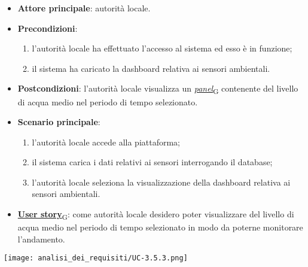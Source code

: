 \begin{itemize}
	\item \textbf{Attore principale}: autorità locale.
	\item \textbf{Precondizioni}:
	      \begin{enumerate}
		      \item l'autorità locale ha effettuato l'accesso al sistema ed esso è in funzione;
		      \item il sistema ha caricato la dashboard relativa ai sensori ambientali.
	      \end{enumerate}
	\item \textbf{Postcondizioni}: l'autorità locale visualizza un \href{https://7last.github.io/docs/pb/documentazione-interna/glossario\#panel}{\textit{panel}\textsubscript{G}} contenente del livello di acqua medio nel periodo di tempo selezionato.
	\item \textbf{Scenario principale}:
	      \begin{enumerate}
		      \item l'autorità locale accede alla piattaforma;
		      \item il sistema carica i dati relativi ai sensori interrogando il database;
		      \item l'autorità locale seleziona la visualizzazione della dashboard relativa ai sensori ambientali.
	      \end{enumerate}
	\item \href{https://7last.github.io/docs/pb/documentazione-interna/glossario\#user-story}{\textbf{User story}\textsubscript{G}}:
	      come autorità locale desidero poter visualizzare del livello di acqua medio nel periodo di tempo selezionato
	      in modo da poterne monitorare l'andamento.
\end{itemize}
\begin{center}
	\texttt{[image: analisi\_dei\_requisiti/UC-3.5.3.png]}
\end{center}


